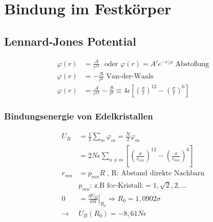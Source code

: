 \section{Bindung im Festkörper}

\subsection*{Lennard-Jones Potential}
\begin{equation*}
    \begin{aligned}
        \varphi(r) &= \frac{\mathcal{A}}{r^{12}} \; \text{ oder } \varphi(r) = A' e^{-r/\rho}  \text{ Abstoßung} \\
        \varphi(r) &= - \frac{\mathcal{B}}{r^6} \text{ Van-der-Waals} \\
        \varphi(r) &= \frac{\mathcal{A}}{r^{12}} - \frac{\mathcal{B}}{r^6} \equiv 4 \epsilon \left[\left(\frac{\sigma}{r}\right)^{12}-\left(\frac{\sigma}{r}\right)^6\right]
    \end{aligned}
\end{equation*}

\subsubsection*{Bindungsenergie von Edelkristallen}
\begin{equation*}
    \begin{aligned}
        U_B &= \frac{1}{2} \sum_m \varphi_m = \frac{N}{2} \varphi_m \\
            &= 2N\epsilon \sum_{n \neq m} \left[\left(\frac{\sigma}{r_{mn}}\right)^{12}- \left(\frac{\sigma}{r_{mn}}\right)^6\right] \\
        r_{mn} &= p_{mn} R \; \text{, R: Abstand direkte Nachbarn}\\
            & p_{mn} \text{: z.B fcc-Kristall:} = 1, \sqrt{2}, 2, \dots \\
        0 &= \left. \frac{dU_B}{dR} \right|_{R_0} \Rightarrow R_0 = 1,0902 \sigma \\
        \rightarrow &U_B (R_0 ) = -8,61 N \epsilon
    \end{aligned}  
\end{equation*}

